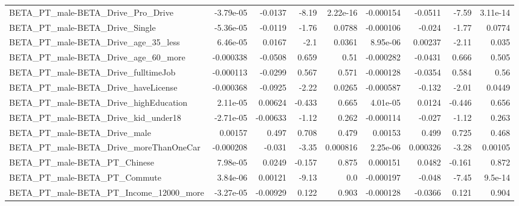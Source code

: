 \begin{tabular}{lrrrrrrrr}
BETA\_PT\_male-BETA\_Drive\_Pro\_Drive                  &   -3.79e-05 &      -0.0137 &     -8.19 & 2.22e-16 &  -0.000154 &     -0.0511 &        -7.59 &      3.11e-14 \\
BETA\_PT\_male-BETA\_Drive\_Single                     &   -5.36e-05 &      -0.0119 &     -1.76 &   0.0788 &  -0.000106 &      -0.024 &        -1.77 &        0.0774 \\
BETA\_PT\_male-BETA\_Drive\_age\_35\_less                &    6.46e-05 &       0.0167 &      -2.1 &   0.0361 &   8.95e-06 &     0.00237 &        -2.11 &         0.035 \\
BETA\_PT\_male-BETA\_Drive\_age\_60\_more                &   -0.000338 &      -0.0508 &     0.659 &     0.51 &  -0.000282 &     -0.0431 &        0.666 &         0.505 \\
BETA\_PT\_male-BETA\_Drive\_fulltimeJob                &   -0.000113 &      -0.0299 &     0.567 &    0.571 &  -0.000128 &     -0.0354 &        0.584 &          0.56 \\
BETA\_PT\_male-BETA\_Drive\_haveLicense                &   -0.000368 &      -0.0925 &     -2.22 &   0.0265 &  -0.000587 &      -0.132 &        -2.01 &        0.0449 \\
BETA\_PT\_male-BETA\_Drive\_highEducation              &    2.11e-05 &      0.00624 &    -0.433 &    0.665 &   4.01e-05 &      0.0124 &       -0.446 &         0.656 \\
BETA\_PT\_male-BETA\_Drive\_kid\_under18                &   -2.71e-05 &     -0.00633 &     -1.12 &    0.262 &  -0.000114 &      -0.027 &        -1.12 &         0.263 \\
BETA\_PT\_male-BETA\_Drive\_male                       &     0.00157 &        0.497 &     0.708 &    0.479 &    0.00153 &       0.499 &        0.725 &         0.468 \\
BETA\_PT\_male-BETA\_Drive\_moreThanOneCar             &   -0.000208 &       -0.031 &     -3.35 & 0.000816 &   2.25e-06 &    0.000326 &        -3.28 &       0.00105 \\
BETA\_PT\_male-BETA\_PT\_Chinese                       &    7.98e-05 &       0.0249 &    -0.157 &    0.875 &   0.000151 &      0.0482 &       -0.161 &         0.872 \\
BETA\_PT\_male-BETA\_PT\_Commute                       &    3.84e-06 &      0.00121 &     -9.13 &      0.0 &  -0.000197 &      -0.048 &        -7.45 &       9.5e-14 \\
BETA\_PT\_male-BETA\_PT\_Income\_12000\_more             &   -3.27e-05 &     -0.00929 &     0.122 &    0.903 &  -0.000128 &     -0.0366 &        0.121 &         0.904 \\

\end{tabular}
